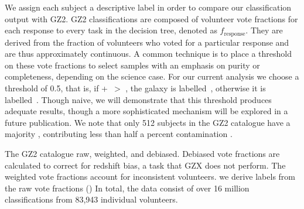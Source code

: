 {We assign each subject a descriptive label in order to compare our classification output with GZ2. GZ2 classifications are composed of volunteer vote fractions for each response to every task in the decision tree, denoted as $f_{\mathrm{response}}$. They are derived from the fraction of volunteers who voted for a particular response and are thus approximately continuous. A common technique is to place a threshold on these vote fractions to select samples with an emphasis on purity or completeness, depending on the science case. For our current analysis we choose a threshold of 0.5, that is, if \ffeat+\fstar~$ >$ \fsmooth, the galaxy is labelled~\feat, otherwise it is labelled~\notfeat.  Though naive, we will demonstrate that this threshold produces adequate results, though a more sophisticated mechanism will be explored in a future publication.} 
 We note that only 512 subjects in the GZ2 catalogue have a majority \fstar, contributing less than half a percent contamination .

The GZ2 catalogue  raw, weighted, and debiased. Debiased vote fractions are calculated to correct for redshift bias, a task that GZX does not perform. The weighted vote fractions account for inconsistent volunteers.  we derive labels from the raw vote fractions (\raw)  In total, the data consist of over 16 million classifications from 83,943 individual volunteers. 


